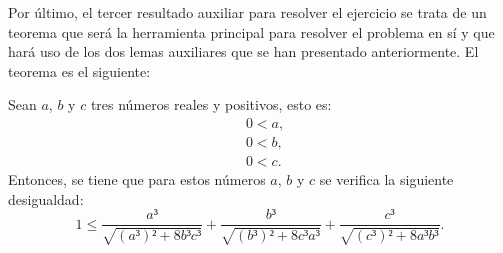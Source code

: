 Por último, el tercer resultado auxiliar para resolver el ejercicio
se trata de un teorema que será la herramienta principal para
resolver el problema en sí y que hará uso de los dos lemas auxiliares
que se han presentado anteriormente. El teorema es el siguiente:
\begin{teorema}\label{teoremaaux}
  Sean \(a\), \(b\) y \(c\) tres números reales y positivos, esto es:
  \begin{align}
    &0 < a, \label{haq2t}\tag{ha}\\
    &0 < b, \label{hbq2t}\tag{hb}\\
    &0 < c. \label{hcq2t}\tag{hc}
  \end{align}
  Entonces, se tiene que para estos números \(a\), \(b\) y \(c\) se
  verifica la siguiente desigualdad:
  \begin{equation}\label{eqteorema}
    1 ≤ \frac{a³}{\sqrt{(a³)²+8b³c³}}+\frac{b³}{\sqrt{(b³)²+8c³a³}}+
    \frac{c³}{\sqrt{(c³)²+8a³b³}}.
  \end{equation}
\end{teorema}

